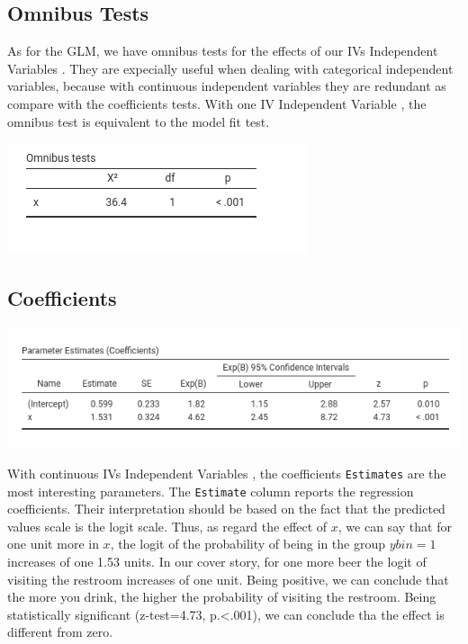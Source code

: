 \documentclass[
]{book}
\begin{document}
\hypertarget{omnibus-tests-1}{%
\subsection{Omnibus Tests}\label{omnibus-tests-1}}

As for the GLM, we have omnibus tests for the effects of our {IVs {Independent Variables} }. They are expecially useful when dealing with categorical independent variables, because with continuous independent variables they are redundant as compare with the coefficients tests. With one {IV {Independent Variable} }, the omnibus test is equivalent to the model fit test.

\includegraphics{bookletpics/3_logistic_output3.png}

\hypertarget{coefficients-1}{%
\subsection{Coefficients}\label{coefficients-1}}

\includegraphics{bookletpics/3_logistic_output4.png}

With continuous {IVs {Independent Variables} }, the coefficients \texttt{Estimates} are the most interesting parameters.
The \texttt{Estimate} column reports the regression coefficients. Their interpretation should be based on the fact that the predicted values scale is the logit scale. Thus, as regard the effect of \(x\), we can say that for one unit more in \(x\), the logit of the probability of being in the group \(ybin=1\) increases of one 1.53 units. In our cover story, for one more beer the logit of visiting the restroom increases of one unit. Being positive, we can conclude that the more you drink, the higher the probability of visiting the restroom. Being statistically significant (z-test=4.73, p.\textless.001), we can conclude tha the effect is different from zero.
\end{document}

